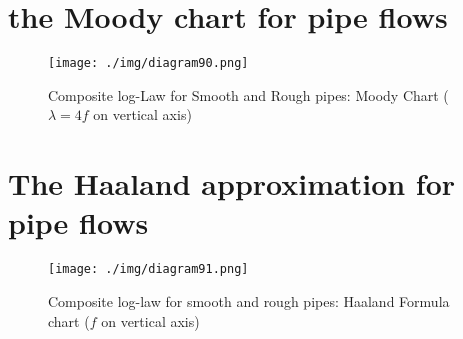 \section{the Moody chart for pipe flows}
\begin{figure}[H]
  \centering
  \texttt{[image: ./img/diagram90.png]}
  \caption{Composite log-Law for Smooth and Rough pipes: Moody Chart ($\lambda = 4f$ on vertical axis)}
\end{figure}
\section{The Haaland approximation for pipe flows}
\begin{figure}[H]
  \centering
  \texttt{[image: ./img/diagram91.png]}
  \caption{Composite log-law for smooth and rough pipes: Haaland Formula chart ($f$ on vertical axis)}
\end{figure}